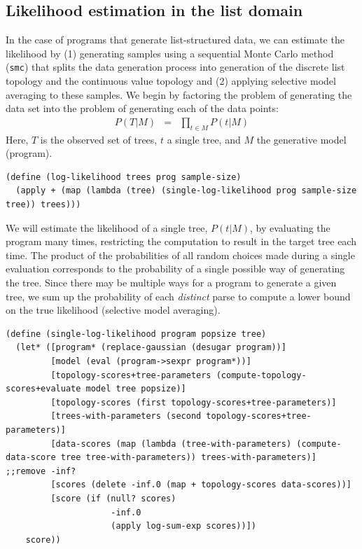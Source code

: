\documentclass[a4paper,10pt]{article}
\begin{document}
\subsection{Likelihood estimation in the list domain}

In the case of programs that generate list-structured data, we can estimate the likelihood by (1) generating samples using a sequential Monte Carlo method (\texttt{smc}) that splits the data generation process into generation of the discrete list topology and the continuous value topology and (2) applying selective model averaging to these samples. We begin by factoring the problem of generating the data set into the problem of generating each of the data points:
\begin{eqnarray}
P(T|M) &=& \prod_{t \in M}P(t|M)
\end{eqnarray}
Here, $T$ is the observed set of trees, $t$ a single tree, and $M$ the generative model (program).
\begin{lstlisting}[frame=trbl]
(define (log-likelihood trees prog sample-size)
  (apply + (map (lambda (tree) (single-log-likelihood prog sample-size tree)) trees)))
\end{lstlisting}
We will estimate the likelihood of a single tree, $P(t|M)$, by evaluating the program many times, restricting the computation to result in the target tree each time. The product of the probabilities of all random choices made during a single evaluation corresponds to the probability of a single possible way of generating the tree. Since there may be multiple ways for a program to generate a given tree, we sum up the probability of each {\em distinct} parse to compute a lower bound on the true likelihood (selective model averaging).
\begin{lstlisting}[frame=trbl]
(define (single-log-likelihood program popsize tree)
  (let* ([program* (replace-gaussian (desugar program))]
         [model (eval (program->sexpr program*))]
         [topology-scores+tree-parameters (compute-topology-scores+evaluate model tree popsize)]
         [topology-scores (first topology-scores+tree-parameters)]
         [trees-with-parameters (second topology-scores+tree-parameters)]
         [data-scores (map (lambda (tree-with-parameters) (compute-data-score tree tree-with-parameters)) trees-with-parameters)] ;;remove -inf?
         [scores (delete -inf.0 (map + topology-scores data-scores))]
         [score (if (null? scores)
                     -inf.0
                     (apply log-sum-exp scores))])
    score))
\end{lstlisting}
\end{document}

